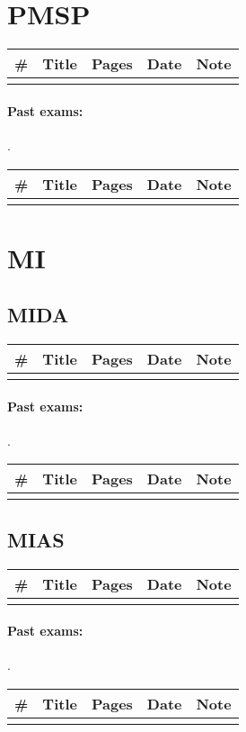 \documentclass[a4paper,12pt]{article} %
\begin{document}
\section{PMSP}
\begin{tabularx}{\textwidth}{|l|X|c|l|c|}
	\hline
	\# & Title & Pages & Date & Note \\
	\hline
	&  &  &  &  \\
	\hline
\end{tabularx}

\paragraph{Past exams:}.\\
\begin{tabularx}{\textwidth}{|l|X|c|l|c|}
	\hline
	\# & Title & Pages & Date & Note \\
	\hline
	&  &  &  &  \\
	\hline
\end{tabularx}

\newpage
\section{MI}
\subsection{MIDA}
\begin{tabularx}{\textwidth}{|l|X|c|l|c|}
	\hline
	\# & Title & Pages & Date & Note \\
	\hline
	&  &  &  &  \\
	\hline
\end{tabularx}

\paragraph{Past exams:}.\\
\begin{tabularx}{\textwidth}{|l|X|c|l|c|}
	\hline
	\# & Title & Pages & Date & Note \\
	\hline
	&  &  &  &  \\
	\hline
\end{tabularx}

\subsection{MIAS}
\begin{tabularx}{\textwidth}{|l|X|c|l|c|}
	\hline
	\# & Title & Pages & Date & Note \\
	\hline
	&  &  &  &  \\
	\hline
\end{tabularx}

\paragraph{Past exams:}.\\
\begin{tabularx}{\textwidth}{|l|X|c|l|c|}
	\hline
	\# & Title & Pages & Date & Note \\
	\hline
	&  &  &  &  \\
	\hline
\end{tabularx}

\end{document}
